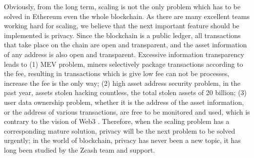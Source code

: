 Obviously, from the long term, scaling is not the only problem which has to be solved in Ethereum \cite{website:Ethereum} even the whole blockchain. As there are
many excellent teams working hard for scaling, we believe that the next important feature should be implemented is privacy. Since the blockchain is 
a public ledger, all transactions that take place on the chain are open and transparent, 
and the asset information of any address is also open and transparent. Excessive 
information transparency leads to (1) MEV problem, miners selectively package 
transactions according to the fee, resulting in transactions which is give low fee can not be 
processes, increase the fee is the only way; (2) high asset address security problem, in the past 
year, assets stolen hacking countless, the total stolen assets of 20 billion; (3) user data 
ownership problem, whether it is the address of the asset information, or the address of 
various transactions, are free to be monitored and used, which is contrary to 
the vision of Web3 \cite{website:Web3} . Therefore, when the scaling problem has a corresponding mature 
solution, privacy will be the next problem to be solved urgently; in the world of 
blockchain, privacy has never been a new topic, it has long been studied by the Zcash \cite{website:Zcash} team 
and support.




